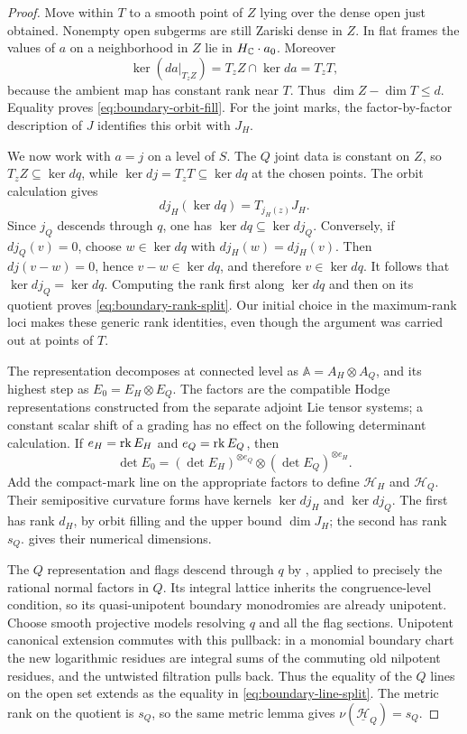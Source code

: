 \begin{proof}
Move within $T$ to a smooth point of $Z$ lying over the dense open
just obtained.  Nonempty open subgerms are still Zariski dense in
$Z$.  In flat frames the values of $a$ on a neighborhood in $Z$
lie in $H_{\mathbb C}\cdot a_0$.  Moreover
\[
 \ker(da|_{T_zZ})=T_zZ\cap\ker da=T_zT,
\]
because the ambient map has constant rank near $T$.  Thus
$\dim Z-\dim T\leq d$.  Equality proves
\eqref{eq:boundary-orbit-fill}.  For the joint marks, the
factor-by-factor description of $J$ identifies this orbit with
$J_H$.

We now work with $a=j$ on a level of $S$.  The $Q$ joint data is
constant on $Z$, so $T_zZ\subseteq\ker dq$, while
$\ker dj=T_zT\subseteq\ker dq$ at the chosen points.  The orbit
calculation gives
\[
                   dj_H(\ker dq)=T_{j_H(z)}J_H.
\]
Since $j_Q$ descends through $q$, one has
$\ker dq\subseteq\ker dj_Q$.  Conversely, if $dj_Q(v)=0$, choose
$w\in\ker dq$ with $dj_H(w)=dj_H(v)$.  Then $dj(v-w)=0$, hence
$v-w\in\ker dq$, and therefore $v\in\ker dq$.  It follows that
$\ker dj_Q=\ker dq$.  Computing the rank first along $\ker dq$
and then on its quotient proves \eqref{eq:boundary-rank-split}.
Our initial choice in the maximum-rank loci makes these generic
rank identities, even though the argument was carried out at
points of $T$.

The representation decomposes at connected level as
$\mathbb A=A_H\otimes A_Q$, and its highest step as
$E_0=E_H\otimes E_Q$.  The factors are the compatible Hodge
representations constructed from the separate adjoint Lie tensor
systems; a constant scalar shift of a grading has no effect on
the following determinant calculation.  If $e_H=\operatorname{rk} E_H$ and
$e_Q=\operatorname{rk} E_Q$, then
\[
 \det E_0=(\det E_H)^{\otimes e_Q}
                    \otimes(\det E_Q)^{\otimes e_H}.
\]
Add the compact-mark line on the appropriate factors to define
$\mathcal H_H$ and $\mathcal H_Q$.  Their semipositive curvature
forms have kernels $\ker dj_H$ and $\ker dj_Q$.  The first has
rank $d_H$, by orbit filling and the upper bound $\dim J_H$;
the second has rank $s_Q$.   gives their
numerical dimensions.

The $Q$ representation and flags descend through $q$ by
, applied to precisely the rational
normal factors in $Q$.  Its integral lattice inherits the
congruence-level condition, so its quasi-unipotent boundary
monodromies are already unipotent.  Choose smooth projective
models resolving $q$ and all the flag sections.  Unipotent
canonical extension commutes with this pullback: in a monomial
boundary chart the new logarithmic residues are integral sums
of the commuting old nilpotent residues, and the untwisted
filtration pulls back.  Thus the equality of the $Q$ lines on
the open set extends as the equality in
\eqref{eq:boundary-line-split}.  The metric rank on the quotient
is $s_Q$, so the same metric lemma gives
$\nu(\underline{\mathcal H}_Q)=s_Q$.
\end{proof}

